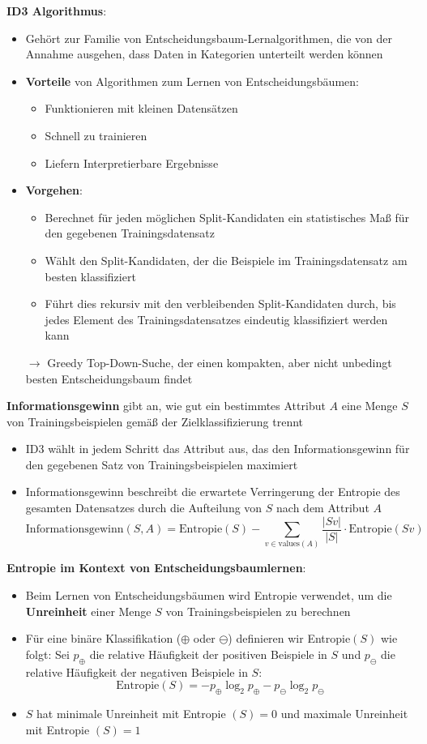 \textbf{ID3 Algorithmus}:
\begin{itemize}
	\item Gehört zur Familie von Entscheidungsbaum-Lernalgorithmen, die von der Annahme ausgehen, dass Daten in Kategorien unterteilt werden können
	\item \textbf{Vorteile} von Algorithmen zum Lernen von Entscheidungsbäumen:
	\begin{itemize}
		\item Funktionieren mit kleinen Datensätzen
		\item Schnell zu trainieren
		\item Liefern Interpretierbare Ergebnisse
	\end{itemize}
	\item \textbf{Vorgehen}:
	\begin{itemize}
		\item Berechnet für jeden möglichen Split-Kandidaten ein statistisches Maß für den gegebenen Trainingsdatensatz
		\item Wählt den Split-Kandidaten, der die Beispiele im Trainingsdatensatz am besten klassifiziert
		\item Führt dies rekursiv mit den verbleibenden Split-Kandidaten durch, bis jedes Element des Trainingsdatensatzes eindeutig klassifiziert werden kann
	\end{itemize}
	
	$\rightarrow$ Greedy Top-Down-Suche, der einen kompakten, aber nicht unbedingt besten Entscheidungsbaum findet
\end{itemize}

\textbf{Informationsgewinn} gibt an, wie gut ein bestimmtes Attribut $A$ eine Menge $S$ von Trainingsbeispielen gemäß der Zielklassifizierung trennt
\begin{itemize}
	\item ID3 wählt in jedem Schritt das Attribut aus, das den Informationsgewinn für den gegebenen Satz von Trainingsbeispielen maximiert
	\item Informationsgewinn beschreibt die erwartete Verringerung der Entropie des gesamten Datensatzes durch die Aufteilung von $S$ nach dem Attribut $A$
	$$\text{Informationsgewinn}(S,A)=\text{Entropie}(S)-\sum\limits_{v\in \text{values}(A)}\frac{|Sv|}{|S|}\cdot \text{Entropie}(Sv)$$
\end{itemize}

\textbf{Entropie im Kontext von Entscheidungsbaumlernen}: 
\begin{itemize}
	\item Beim Lernen von Entscheidungsbäumen wird Entropie verwendet, um die \textbf{Unreinheit} einer Menge $S$ von Trainingsbeispielen zu berechnen
	\item Für eine binäre Klassifikation ($\oplus$ oder $\ominus$) definieren wir Entropie$(S)$ wie folgt: Sei $p_\oplus$ die relative Häufigkeit der positiven Beispiele in $S$ und $p_\ominus$ die relative Häufigkeit der negativen Beispiele in $S$:
	$$\text{Entropie}(S)=-p_\oplus \log_2 p_\oplus -p_\ominus\log_2 p_\ominus$$
	\item $S$ hat minimale Unreinheit mit Entropie $(S) = 0$ und maximale Unreinheit mit Entropie $(S) = 1$
\end{itemize}

